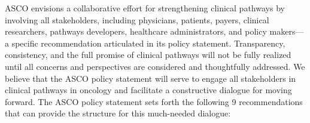 ASCO envisions a collaborative effort for strengthening clinical pathways by
involving all stakeholders, including physicians, patients, payers, clinical
researchers, pathways developers, healthcare administrators, and policy makers—a
specific recommendation articulated in its policy statement. Transparency,
consistency, and the full promise of clinical pathways will not be fully
realized until all concerns and perspectives are considered and thoughtfully
addressed. We believe that the ASCO policy statement will serve to engage all
stakeholders in clinical pathways in oncology and facilitate a constructive
dialogue for moving forward. The ASCO policy statement sets forth the following
9 recommendations that can provide the structure for this much-needed dialogue:

